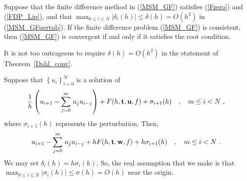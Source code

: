 \begin{theorem}[Dahlquist]
Suppose that the finite difference method in (\ref{MSM_GF}) satisfies
(\ref{Fzero}) and (\ref{FDP_Lip}), and that
$\displaystyle \max_{0 \leq i \leq N} | \delta_i(h) | \leq
\delta(h) = O(h^2)$ in (\ref{MSM_GFpertub}).
If the finite difference problem (\ref{MSM_GF}) is consistent, then
(\ref{MSM_GF}) is convergent if and only if it satisfies the root
condition.  \label{Dahl_conv}
\end{theorem}

\begin{rmk}
It is not too outrageous to require
$\delta(h) = O(h^2)$ in the statement of Theorem~\ref{Dahl_conv}.

Suppose that $\displaystyle \left\{u_i\right\}_{i=0}^N$ is a
solution of
\[
\frac{1}{h} \left( u_{i+1} - \sum_{j=0}^m\,a_ju_{i-j}\right)
+ F(h,\mathbf{t},\mathbf{u},f) + \sigma_{i+1}(h) \quad , \quad m\leq i < N \ ,
\]
where $\sigma_{i+1}(h)$ represents the perturbation.  Then,
\[
u_{i+1} - \sum_{j=0}^m\,a_ju_{i-j} + h  F(h,\mathbf{t},\mathbf{w},f)
+ h\sigma_{i+1}(h) \quad , \quad m\leq i < N \ .
\]
We may set $\delta_i(h) = h \sigma_i(h)$.  So, the real assumption that we
make is that $\displaystyle \max_{0 \leq i \leq N} | \sigma_i(h) | \leq
\sigma(h) = O(h)$ near the origin.
\end{rmk}

